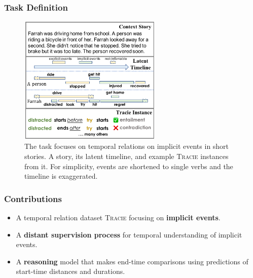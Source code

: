 \documentclass[10pt,aspectratio=43]{beamer}
\newcommand{\datasetname}{\textsc{Tracie}}
\begin{document}
	\begin{frame}
	    \frametitle{\textbf{Task Definition}}
            \begin{figure}[!t]
                \centering
                \includegraphics[width=2.7in]{figures/temporal_reasoning_task.pdf}
                \caption{The task focuses on temporal relations on implicit events in short stories. A story, its latent timeline, and example \datasetname{} instances from it. For simplicity, events are shortened to single verbs and the timeline is exaggerated.}
                \label{fig:temporal-reasoning-task}
            \end{figure}
	\end{frame}
	
	\begin{frame}
	    \frametitle{\textbf{Contributions}}
	    \begin{itemize}
	        \item A temporal relation dataset \datasetname{} focusing on \textbf{implicit events}.
	        \item A \textbf{distant supervision process} for temporal understanding of implicit events.
	        \item A \textbf{reasoning} model that makes end-time comparisons using predictions of start-time distances and durations.
	    \end{itemize}
	\end{frame}
	
\end{document}
